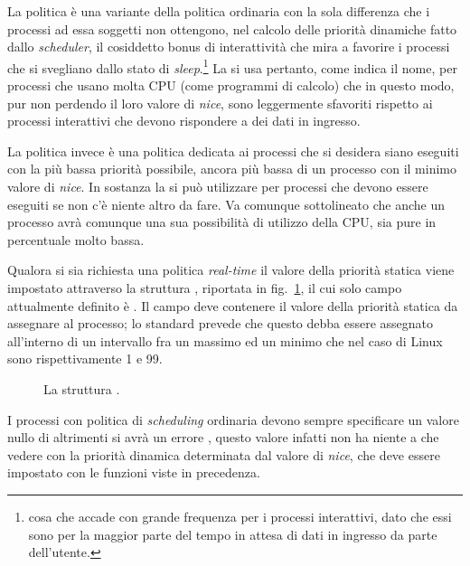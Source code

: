 La politica  è una variante della politica ordinaria con
la sola differenza che i processi ad essa soggetti non ottengono, nel calcolo
delle priorità dinamiche fatto dallo \textit{scheduler}, il cosiddetto bonus
di interattività che mira a favorire i processi che si svegliano dallo stato
di \textit{sleep}.\footnote{cosa che accade con grande frequenza per i
  processi interattivi, dato che essi sono per la maggior parte del tempo in
  attesa di dati in ingresso da parte dell'utente.} La si usa pertanto, come
indica il nome, per processi che usano molta CPU (come programmi di calcolo)
che in questo modo, pur non perdendo il loro valore di \textit{nice}, sono
leggermente sfavoriti rispetto ai processi interattivi che devono rispondere a
dei dati in ingresso.

La politica  invece è una politica dedicata ai processi che
si desidera siano eseguiti con la più bassa priorità possibile, ancora più
bassa di un processo con il minimo valore di \textit{nice}. In sostanza la si
può utilizzare per processi che devono essere eseguiti se non c'è niente altro
da fare. Va comunque sottolineato che anche un processo 
avrà comunque una sua possibilità di utilizzo della CPU, sia pure in
percentuale molto bassa.

Qualora si sia richiesta una politica \textit{real-time} il valore della
priorità statica viene impostato attraverso la struttura
, riportata in fig.~\ref{fig:sig_sched_param}, il cui
solo campo attualmente definito è . Il campo deve
contenere il valore della priorità statica da assegnare al processo; lo
standard prevede che questo debba essere assegnato all'interno di un
intervallo fra un massimo ed un minimo che nel caso di Linux sono
rispettivamente 1 e 99.

\begin{figure}[!htb]
  \footnotesize \centering
  \begin{minipage}[c]{0.5\textwidth}
  \end{minipage} 
  \normalsize 
  \caption{La struttura .} 
  \label{fig:sig_sched_param}
\end{figure}

I processi con politica di \textit{scheduling} ordinaria devono sempre
specificare un valore nullo di  altrimenti si avrà un
errore , questo valore infatti non ha niente a che vedere con
la priorità dinamica determinata dal valore di \textit{nice}, che deve essere
impostato con le funzioni viste in precedenza.

